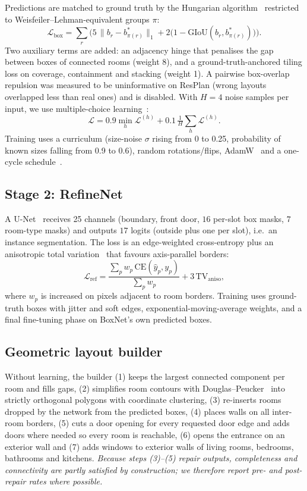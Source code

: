 \documentclass[conference]{IEEEtran}
\begin{document}
Predictions are matched to ground truth by the Hungarian algorithm~\cite{kuhn1955hungarian} restricted to Weisfeiler--Lehman-equivalent groups $\pi$:
\begin{equation}
\mathcal{L}_{\text{box}}=\sum_{r}\Big(5\,\lVert b_r-b^{*}_{\pi(r)}\rVert_1+2\big(1-\mathrm{GIoU}(b_r,b^{*}_{\pi(r)})\big)\Big).
\end{equation}
Two auxiliary terms are added: an adjacency hinge that penalises the gap between boxes of connected rooms (weight 8), and a ground-truth-anchored tiling loss on coverage, containment and stacking (weight 1). A pairwise box-overlap repulsion was measured to be uninformative on ResPlan (wrong layouts overlapped less than real ones) and is disabled. With $H=4$ noise samples per input, we use multiple-choice learning~\cite{guzman2012mcl}:
\begin{equation}
\mathcal{L}=0.9\min_{h}\mathcal{L}^{(h)}+0.1\,\tfrac1H\sum_{h}\mathcal{L}^{(h)}.
\end{equation}
Training uses a curriculum (size-noise $\sigma$ rising from 0 to 0.25, probability of known sizes falling from 0.9 to 0.6), random rotations/flips, AdamW~\cite{loshchilov2019adamw} and a one-cycle schedule~\cite{smith2019onecycle}.

\subsection{Stage 2: RefineNet}
A U-Net~\cite{ronneberger2015unet} receives 25 channels (boundary, front door, $16$ per-slot box masks, $7$ room-type masks) and outputs $17$ logits (outside plus one per slot), i.e.\ an instance segmentation. The loss is an edge-weighted cross-entropy plus an anisotropic total variation~\cite{rudin1992tv} that favours axis-parallel borders:
\begin{equation}
\mathcal{L}_{\text{ref}}=\frac{\sum_p w_p\,\mathrm{CE}(\hat y_p,y_p)}{\sum_p w_p}+3\,\mathrm{TV}_{\text{aniso}},
\end{equation}
where $w_p$ is increased on pixels adjacent to room borders. Training uses ground-truth boxes with jitter and soft edges, exponential-moving-average weights, and a final fine-tuning phase on BoxNet's own predicted boxes.

\subsection{Geometric layout builder}
Without learning, the builder (1) keeps the largest connected component per room and fills gaps, (2) simplifies room contours with Douglas--Peucker~\cite{douglas1973peucker} into strictly orthogonal polygons with coordinate clustering, (3) re-inserts rooms dropped by the network from the predicted boxes, (4) places walls on all inter-room borders, (5) cuts a door opening for every requested door edge and adds doors where needed so every room is reachable, (6) opens the entrance on an exterior wall and (7) adds windows to exterior walls of living rooms, bedrooms, bathrooms and kitchens. \emph{Because steps (3)--(5) repair outputs, completeness and connectivity are partly satisfied by construction; we therefore report pre- and post-repair rates where possible.}
\end{document}
